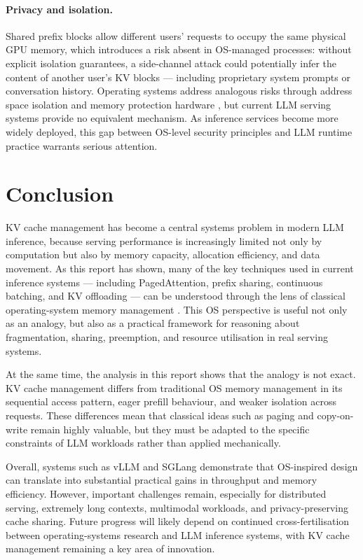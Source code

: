 \documentclass[10pt, a4paper]{article}
\begin{document}
\paragraph{Privacy and isolation.}
Shared prefix blocks allow different users' requests to occupy the same
physical GPU memory, which introduces a risk absent in OS-managed
processes: without explicit isolation guarantees, a side-channel attack
could potentially infer the content of another user's KV blocks ---
including proprietary system prompts or conversation history.
Operating systems address analogous risks through address space
isolation and memory protection hardware \cite{silberschatz2018os},
but current LLM serving systems provide no equivalent mechanism.
As inference services become more widely deployed, this gap between
OS-level security principles and LLM runtime practice warrants serious
attention.
\section{Conclusion}
\label{sec:conclusion}

KV cache management has become a central systems problem in modern LLM
inference, because serving performance is increasingly limited not only
by computation but also by memory capacity, allocation efficiency, and
data movement. As this report has shown, many of the key techniques
used in current inference systems --- including PagedAttention, prefix
sharing, continuous batching, and KV offloading --- can be understood
through the lens of classical operating-system memory management
\cite{kwon2023vllm,zheng2024sglang}. This OS perspective is useful not
only as an analogy, but also as a practical framework for reasoning
about fragmentation, sharing, preemption, and resource utilisation in
real serving systems.

At the same time, the analysis in this report shows that the analogy is
not exact. KV cache management differs from traditional OS memory
management in its sequential access pattern, eager prefill behaviour,
and weaker isolation across requests. These differences mean that
classical ideas such as paging and copy-on-write remain highly
valuable, but they must be adapted to the specific constraints of LLM
workloads rather than applied mechanically.

Overall, systems such as vLLM and SGLang demonstrate that OS-inspired
design can translate into substantial practical gains in throughput and
memory efficiency. However, important challenges remain, especially for
distributed serving, extremely long contexts, multimodal workloads, and
privacy-preserving cache sharing. Future progress will likely depend on
continued cross-fertilisation between operating-systems research and
LLM inference systems, with KV cache management remaining a key area of
innovation.



\newpage


\end{document}
